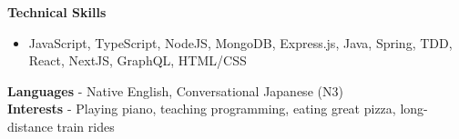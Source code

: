
\begin{cvparagraph}

  \textbf{Technical Skills}
  \begin{itemize}[noitemsep, topsep=-0.6em, leftmargin=1.5em]
    \item {JavaScript, TypeScript, NodeJS, MongoDB, Express.js, Java, Spring, TDD, React, NextJS, GraphQL, HTML/CSS}
  \end{itemize}

  \textbf{Languages} - Native English, Conversational Japanese (N3)\\
  \textbf{Interests} - Playing piano, teaching programming, eating great pizza, long-distance train rides

\end{cvparagraph}
